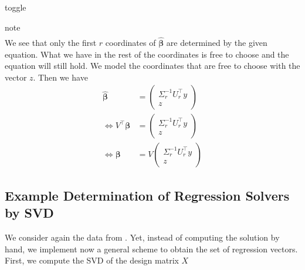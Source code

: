 \documentclass[letterpaper,10pt,english]{jupyterBook}
\begin{document}
\begin{sphinxuseclass}{toggle}
\begin{sphinxadmonition}{note}
\begin{align}
\end{align}
\sphinxAtStartPar
We see that only the first \(r\) coordinates of \(\hat{\bm\beta}\) are determined by the given equation. What we have in the rest of the coordinates is free to choose and the equation will still hold. We model the coordinates that are free to choose with the vector \(z\). Then we have
\label{equation:regression_optimization:dae68bb3-0141-4e16-9f83-e0028f08d96f}\begin{align}
\hat{\bm\beta} &= \begin{pmatrix}\Sigma_r^{-1} U_r^\top y\\z \end{pmatrix}\\
\Leftrightarrow V^\top\bm\beta &= \begin{pmatrix}\Sigma_r^{-1} U_r^\top y\\z \end{pmatrix}\\
\Leftrightarrow \bm\beta &= V\begin{pmatrix}\Sigma_r^{-1} U_r^\top y\\z \end{pmatrix}
\end{align}\end{sphinxadmonition}

\end{sphinxuseclass}

\subsection{Example Determination of Regression Solvers by SVD}
\label{\detokenize{regression_optimization:example-determination-of-regression-solvers-by-svd}}
\sphinxAtStartPar
We consider again the data from {\hyperref[\detokenize{regression_optimization:example_reg_p_larger_n}]{}}. Yet, instead of computing the solution by hand, we implement now a general scheme to obtain the set of regression vectors. First, we compute the SVD of the design matrix \(X\)
\end{document}
